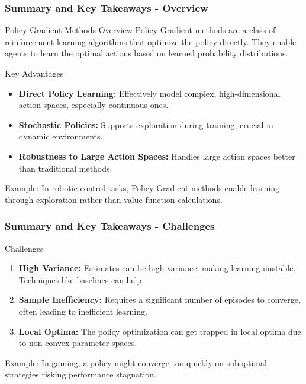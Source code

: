 \documentclass{beamer}
\begin{document}
\begin{frame}[fragile]
    \frametitle{Summary and Key Takeaways - Overview}
    \begin{block}{Policy Gradient Methods Overview}
        Policy Gradient methods are a class of reinforcement learning algorithms that optimize the policy directly. 
        They enable agents to learn the optimal actions based on learned probability distributions.
    \end{block}
    
    \begin{block}{Key Advantages}
        \begin{itemize}
            \item \textbf{Direct Policy Learning:} Effectively model complex, high-dimensional action spaces, especially continuous ones.
            \item \textbf{Stochastic Policies:} Supports exploration during training, crucial in dynamic environments.
            \item \textbf{Robustness to Large Action Spaces:} Handles large action spaces better than traditional methods.
        \end{itemize}
    \end{block}
    
    Example: In robotic control tasks, Policy Gradient methods enable learning through exploration rather than value function calculations.
\end{frame}

\begin{frame}[fragile]
    \frametitle{Summary and Key Takeaways - Challenges}
    \begin{block}{Challenges}
        \begin{enumerate}
            \item \textbf{High Variance:} Estimates can be high variance, making learning unstable. Techniques like baselines can help.
            \item \textbf{Sample Inefficiency:} Requires a significant number of episodes to converge, often leading to inefficient learning.
            \item \textbf{Local Optima:} The policy optimization can get trapped in local optima due to non-convex parameter spaces.
        \end{enumerate}
    \end{block}
    
    Example: In gaming, a policy might converge too quickly on suboptimal strategies risking performance stagnation.
\end{frame}
\end{document}
